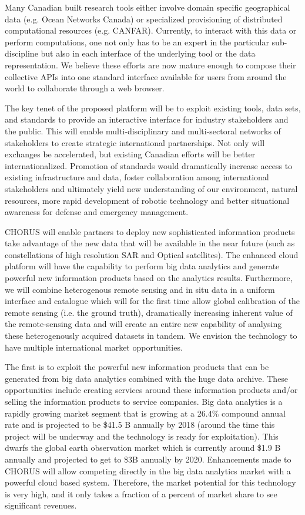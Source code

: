 
Many Canadian built research tools either involve domain specific
geographical data (e.g. Ocean Networks Canada) or specialized
provisioning of distributed computational resources
(e.g. CANFAR). Currently, to interact with this data or perform
computations, one not only has to be an expert in the particular
sub-discipline but also in each interface of the underlying tool or
the data representation.  We believe these efforts are now mature
enough to compose their collective APIs into one standard interface
available for users from around the world to collaborate through a web
browser.

The key tenet of the proposed platform will be to exploit existing
tools, data sets, and standards to provide an interactive interface
for industry stakeholders and the public.  This will enable
multi-disciplinary and multi-sectoral networks of stakeholders to
create strategic international partnerships. Not only will exchanges
be accelerated, but existing Canadian efforts will be better
internationalized.  Promotion of standards would dramatically increase
access to existing infrastructure and data, foster collaboration among
international stakeholders and ultimately yield new understanding of
our environment, natural resources, more rapid development of robotic
technology and better situational awareness for defense and emergency
management.

CHORUS will enable partners to deploy new sophisticated information
products take advantage of the new data that will be available in the
near future (such as constellations of high resolution SAR and Optical
satellites).  The enhanced cloud platform will have the capability to
perform big data analytics and generate powerful new information
products based on the analytics results.  Furthermore, we will combine
heterogenous remote sensing and in situ data in a uniform interface
and catalogue which will for the first time allow global calibration
of the remote sensing (i.e. the ground truth), dramatically increasing
inherent value of the remote-sensing data and will create an entire
new capability of analysing these heterogenously acquired datasets in
tandem.  We envision the technology to have multiple international
market opportunities.

The first is to exploit the powerful new information products that can
be generated from big data analytics combined with the huge data
archive. These opportunities include creating services around these
information products and/or selling the information products to
service companies.  Big data analytics is a rapidly growing market
segment that is growing at a 26.4\% compound annual rate and is
projected to be \$41.5 B annually by 2018 (around the time this project
will be underway and the technology is ready for exploitation). This
dwarfs the global earth observation market which is currently around
\$1.9 B annually and projected to get to \$3B annually by 2020.
Enhancements made to CHORUS will allow competing directly in the big
data analytics market with a powerful cloud based system. Therefore,
the market potential for this technology is very high, and it only
takes a fraction of a percent of market share to see significant
revenues.

